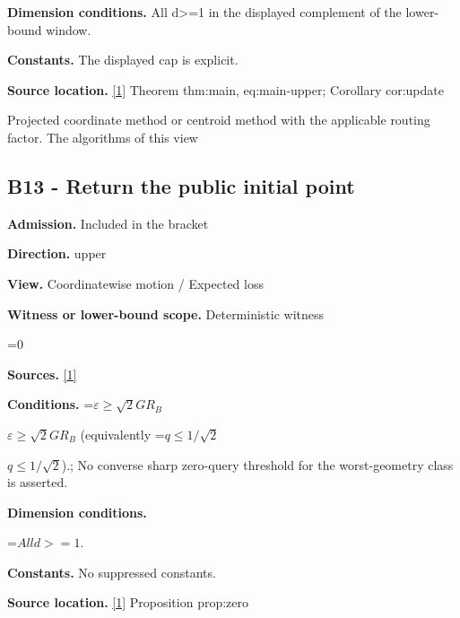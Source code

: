 \documentclass[10pt,a4paper]{article}
\newcommand{\AtlasMath}[1]{\par\begingroup\centering\setbox0=\hbox{$\displaystyle #1$}\ifdim\wd0>1.4\linewidth\typeout{ATLAS WIDE FORMULA: \the\wd0}\fi\ifdim\wd0>\linewidth\resizebox{\linewidth}{!}{\box0}\else\box0\fi\par\endgroup}
\newcommand{\AtlasInlineMath}[1]{\begingroup\setbox0=\hbox{$#1$}\ifdim\wd0>.4\linewidth\endgroup\AtlasMath{#1}\else\endgroup$#1$\fi}
\begin{document}
\textbf{Dimension conditions.} All d>=1 in the displayed complement of the lower-bound window.



\textbf{Constants.} The displayed cap is explicit.



\textbf{Source location.} \href{https://github.com/WU-Wendao/Colombo/blob/main/colombo_sensorium/Complexity_altas/data/sources/colombo/U03/manuscript.pdf}{[1]} Theorem thm:main, eq:main-upper; Corollary cor:update



Projected coordinate method or centroid method with the applicable routing factor. The algorithms of this view



\subsection{B13 - Return the public initial point}


\textbf{Admission.} Included in the bracket



\textbf{Direction.} upper



\textbf{View.} Coordinatewise motion / Expected loss



\textbf{Witness or lower-bound scope.} Deterministic witness



\AtlasMath{0}


\textbf{Sources.} \href{https://github.com/WU-Wendao/Colombo/blob/main/colombo_sensorium/Complexity_altas/data/sources/colombo/U03/manuscript.pdf}{[1]}



\textbf{Conditions.} \AtlasInlineMath{\varepsilon\ge\sqrt2GR_B} (equivalently \AtlasInlineMath{q\le1/\sqrt2}).; No converse sharp zero-query threshold for the worst-geometry class is asserted.



\textbf{Dimension conditions.}



\AtlasMath{All d>=1.}


\textbf{Constants.} No suppressed constants.



\textbf{Source location.} \href{https://github.com/WU-Wendao/Colombo/blob/main/colombo_sensorium/Complexity_altas/data/sources/colombo/U03/manuscript.pdf}{[1]} Proposition prop:zero
\end{document}

